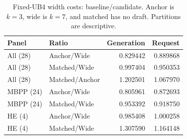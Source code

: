 \begin{table}[ht]\centering\small
\caption{Fixed-UB4 width costs: baseline/candidate. Anchor is $k=3$, wide is $k=7$, and matched has no draft. Partitions are descriptive.}\label{tab:fixed_ub}
\begin{tabular}{@{}llrr@{}}\toprule
Panel & Ratio & Generation & Request\\\midrule
All (28) & Anchor/Wide & 0.829442 & 0.889868\\
All (28) & Matched/Wide & 0.997404 & 0.950353\\
All (28) & Matched/Anchor & 1.202501 & 1.067970\\
MBPP (24) & Anchor/Wide & 0.805961 & 0.872693\\
MBPP (24) & Matched/Wide & 0.953392 & 0.918750\\
HE (4) & Anchor/Wide & 0.985408 & 1.000258\\
HE (4) & Matched/Wide & 1.307590 & 1.164148\\
\bottomrule\end{tabular}

\end{table}
